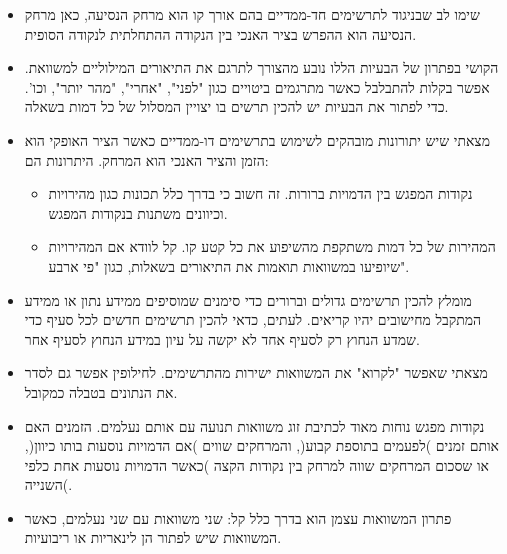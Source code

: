 \begin{itemize}

\item
שימו לב שבניגוד לתרשימים חד-ממדיים בהם אורך קו הוא מרחק הנסיעה, כאן מרחק הנסיעה הוא ההפרש בציר האנכי בין הנקודה ההתחלתית לנקודה הסופית.

\item
הקושי בפתרון של הבעיות הללו נובע מהצורך לתרגם את התיאורים המילוליים למשוואת. אפשר בקלות להתבלבל כאשר מתרגמים ביטויים כגון "לפני", "אחרי", "מהר יותר", וכו'.  כדי לפתור את הבעיות יש להכין תרשים בו יצויין המסלול של כל דמות בשאלה.
\item
מצאתי שיש יתורונות מובהקים לשימוש בתרשימים דו-ממדיים כאשר הציר האופקי הוא הזמן והציר האנכי הוא המרחק. היתרונות הם:
\begin{itemize}
\item
נקודות המפגש בין הדמויות ברורות. זה חשוב כי בדרך כלל תכונות כגון מהירויות וכיוונים משתנות בנקודות המפגש.
\item
המהירות של כל דמות משתקפת מהשיפוע את כל קטע קו. קל לוודא אם המהירויות שיופיעו במשוואות תואמות את התיאורים בשאלות, כגון "פי ארבע".
\end{itemize}
\item
מומלץ להכין תרשימים גדולים וברורים כדי סימנים שמוסיפים ממידע נתון או ממידע המתקבל מחישובים יהיו קריאים. לעתים, כדאי להכין תרשימים חדשים לכל סעיף כדי שמדע הנחוץ רק לסעיף אחד לא יקשה על עיון במידע הנחוץ לסעיף אחר.

\item
מצאתי שאפשר "לקרוא" את המשוואות ישירות מהתרשימים. לחילופין אפשר גם לסדר את הנתונים בטבלה כמקובל.

\item 
נקודות מפגש נוחות מאוד לכתיבת זוג משוואות תנועה עם אותם נעלמים. הזמנים האם אותם זמנים )לפעמים בתוספת קבוע(, והמרחקים שווים )אם הדמויות נוסעות בותו כיוון(, או שסכום המרחקים שווה למרחק בין נקודות הקצה )כאשר הדמויות נוסעות אחת כלפי השנייה(.

\item 
פתרון המשוואות עצמן הוא בדרך כלל קל: שני משוואות עם שני נעלמים, כאשר המשוואות שיש לפתור הן לינאריות או ריבועיות.

\end{itemize}
